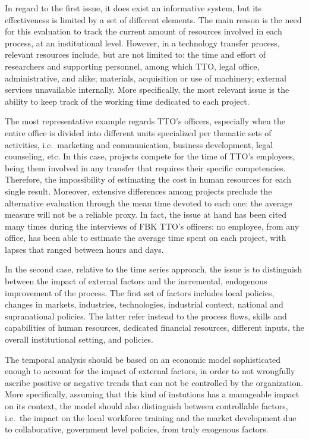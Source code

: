 In regard to the first issue, it does exist an informative system, but its effectiveness is limited by a set of different elements. The main reason is the need for this evaluation to track the current amount of resources involved in each process, at an institutional level. However, in a technology transfer process, relevant resources include, but are not limited to: the time and effort of researchers and supporting personnel, among which TTO, legal office, administrative, and alike; materials, acquisition or use of machinery; external services unavailable internally. More specifically, the most relevant issue is the ability to keep track of the working time dedicated to each project. 

The most representative example regards TTO's officers, especially when the entire office is divided into different units specialized per thematic sets of activities, i.e.\ marketing and communication, business development, legal counseling, etc. In this case, projects compete for the time of TTO's employees, being them involved in any transfer that requires their specific competencies. Therefore, the impossibility of estimating the cost in human resources for each single result. Moreover, extensive differences among projects preclude the alternative evaluation through the mean time devoted to each one: the average measure will not be a reliable proxy. In fact, the issue at hand has been cited many times during the interviews of FBK TTO's officers: no employee, from any office, has been able to estimate the average time spent on each project, with lapses that ranged between hours and days.

In the second case, relative to the time series approach, the issue is to distinguish between the impact of external factors and the incremental, endogenous improvement of the process. The first set of factors includes local policies, changes in markets, industries, technologies, industrial context, national and supranational policies. The latter refer instead to the process flows, skills and capabilities of human resources, dedicated financial resources, different inputs, the overall institutional setting, and policies.

The temporal analysis should be based on an economic model sophisticated enough to account for the impact of external factors, in order to not wrongfully ascribe positive or negative trends that can not be controlled by the organization. More specifically, assuming that this kind of instutions has a manageable impact on its context, the model should also distinguish between controllable factors, i.e.\ the impact on the local workforce training and the market development due to collaborative, government level policies, from truly exogenous factors.

